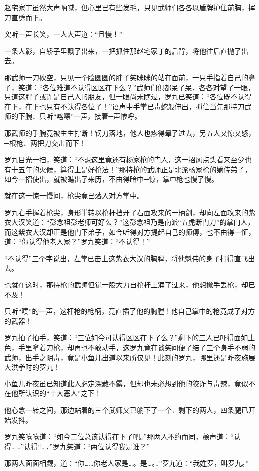\documentclass[12pt,oneside]{book}
\begin{document}
赵宅家丁虽然大声呐喊，但心里已有些发毛，只见武师们各各以盾牌护住前胸，挥刀直劈而下。

突听一声长笑，一人大声道：``且慢！''

一条人影，自轿子里飘了出来，一把抓住那赵宅家丁的后背，将他往后直抛了出去。

那武师一刀砍空，只见一个脸圆圆的胖子笑眯眯的站在面前，一只手指着自己的鼻子，笑道：``各位难道不认得区区在下么？''武师们俱都呆了呆．各各对望了一眼，只道这胖子或许是自己人的朋友，但一眼尚未瞧过，罗九已笑道：``各位既不认得在下，在下也只有不认得各位了！''语声中手掌已毒蛇般伸出，抓住当先那持刀武师的下腕．只听``喀嚓''一声，接着─声惨呼。

那武师的手腕竟被生生拧断！钢刀落地，他人也疼得晕了过去，另五人又惊又怒，─根枪、两把刀交击而下！

罗九目光一扫，笑道：``不想这里竟还有杨家枪的门人，这一招风点头看来至少也有十五年的火候，算得上是好枪法！''那持枪的武师正是北派杨家枪的嫡传弟子，如今一招使出，就被瞧出了来历，不由得暗中─惊，掌中枪也慢了慢。

就在这一惊一慢间，枪尖竟已落入对方掌中。

罗九右手握着枪尖，身形半转以枪杆挡开了右面攻来的一柄剑，却向左面攻来的紫衣大汉笑道：``彭念祖彭老师可好么？''这彭念祖乃是南派``五虎断门刀''的掌门人，而这紫衣大汉却正是他门下弟子，如今听得对方提起自己的师傅，也不由得一怔，道：``你认得他老人家？''罗九笑道：``不认得！''

``不认得''三个字说出，左掌已击上这紫衣大汉的胸膛，将他魁伟的身子打得直飞出去。

也就在这时，那持枪的武师但觉一股大力自枪杆上涌了过来，他想撤手丢枪，却已不及！

只听``噗''的一声，这杆枪的枪柄，竟直插了他的胸膛！他自己掌中的枪竟成了对方的武器！

罗九拍了拍手，笑道：``三位如今可认得区区在下了么？''剩下的三人已吓得面如土色，手里拿着刀枪，却再也不敢动手，这罗九竟在谈笑间便了结了三个身手不弱的武师，出手之阴毒，竟是小鱼儿出道以来所仅见！此刻的罗九，哪里还是昨夜施展大洪拳时的罗九！

小鱼儿昨夜虽已知道此人必定深藏不露，但却也未必想到他的狡诈与毒辣，竟似不在他所认识的``十大恶人''之下！

他心念一转之间，那边站着的三个武师又已躺下了一个，剩下的两人，四条腿已开始发抖。

罗九笑嘻嘻道：``如今二位总该认得在下了吧。''那两人不约而同，颤声道：``认得\ldots\ldots{}''认得``\ldots．''罗九笑道：``两位认得我是谁？''

那两人面面相觑，道：``你\ldots\ldots 你老人家是\ldots。是\ldots。．''罗九道：``我姓罗，叫罗九。''
\end{document}
